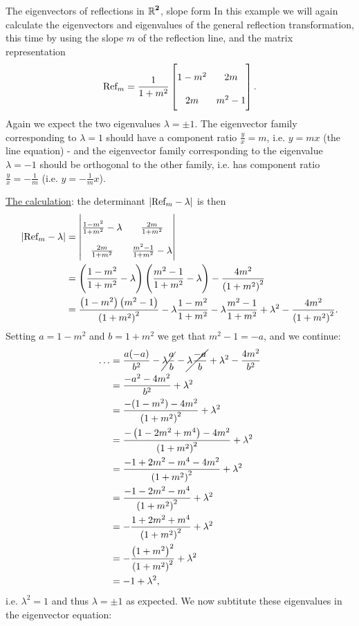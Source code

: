 \begin{example}{The eigenvectors of reflections in $\bm{\Rs[2]}$, slope form}{}
	In this example we will again calculate the eigenvectors and eigenvalues of the general reflection transformation, this time by using the slope $m$ of the reflection line, and the matrix representation
	\[
		\Refl_{m} = \frac{1}{1+m^{2}}
		\begin{bmatrix}
			1-m^{2} & 2m \\
			2m & m^{2}-1
		\end{bmatrix}.
	\]
	Again we expect the two eigenvalues $\lambda=\pm1$. The eigenvector family corresponding to $\lambda=1$ should have a component ratio $\frac{y}{x}=m$, i.e. $y=mx$ (the line equation) - and the eigenvector family corresponding to the eigenvalue $\lambda=-1$ should be orthogonal to the other family, i.e. has component ratio $\frac{y}{x}=-\frac{1}{m}$ (i.e. $y=-\frac{1}{m}x$).

	\underline{The calculation}: the determinant $\left|\Refl_{m}-\lambda\right|$ is then
	\begin{align*}
		\left|\Refl_{m}-\lambda\right| &=
		{\renewcommand{\arraystretch}{2}
			\begin{vmatrix}
				\frac{1-m^{2}}{1+m^{2}}-\lambda & \frac{2m}{1+m^{2}} \\
				\frac{2m}{1+m^{2}} & \frac{m^{2}-1}{1+m^{2}}-\lambda
			\end{vmatrix}
		}\\
		&= \left( \frac{1-m^{2}}{1+m^{2}}-\lambda \right) \left(  \frac{m^{2}-1}{1+m^{2}}-\lambda \right) - \frac{4m^{2}}{\left(1+m^{2}\right)^{2}}\\
		&= \frac{\left(1-m^{2}\right)\left(m^{2}-1\right)}{\left(1+m^{2}\right)^{2}} - \lambda\frac{1-m^{2}}{1+m^{2}} - \lambda\frac{m^{2}-1}{1+m^{2}} + \lambda^{2} - \frac{4m^{2}}{\left(1+m^{2}\right)^{2}}.
	\end{align*}
	Setting $a=1-m^{2}$ and $b=1+m^{2}$ we get that  $m^{2}-1=-a$, and we continue:
	\begin{align*}
		\ldots &= \frac{a(-a)}{b^{2}} - \cancel{\lambda\frac{a}{b}} - \cancel{\lambda\frac{-a}{b}} + \lambda^{2} - \frac{4m^{2}}{b^{2}}\\
			   &= \frac{-a^{2}-4m^{2}}{b^{2}}+\lambda^{2}\\
			   &= \frac{-(1-m^{2})-4m^{2}}{\left(1+m^{2}\right)^{2}}+\lambda^{2}\\
			   &= \frac{-\left(1-2m^{2}+m^{4}\right)-4m^{2}}{\left(1+m^{2}\right)^{2}}+\lambda^{2}\\
			   &= \frac{-1+2m^{2}-m^{4}-4m^{2}}{\left(1+m^{2}\right)^{2}}+\lambda^{2}\\
			   &= \frac{-1-2m^{2}-m^{4}}{\left(1+m^{2}\right)^{2}}+\lambda^{2}\\
			   &= -\frac{1+2m^{2}+m^{4}}{\left(1+m^{2}\right)^{2}}+\lambda^{2}\\
			   &= -\frac{\left(1+m^{2}\right)^{2}}{\left(1+m^{2}\right)^{2}}+\lambda^{2}\\
			   &= -1+\lambda^{2},
	\end{align*}
	i.e. $\lambda^{2}=1$ and thus $\lambda=\pm1$ as expected. We now subtitute these eigenvalues in the eigenvector equation:


\end{example}
